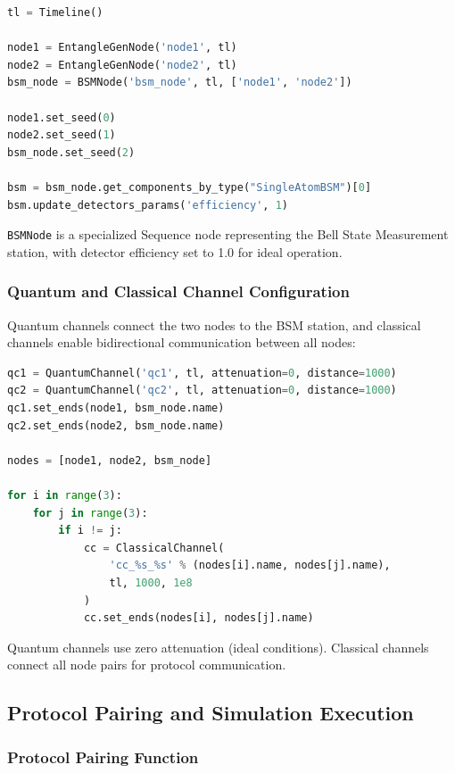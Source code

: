 \begin{lstlisting}[language=Python, breaklines=true]
tl = Timeline()

node1 = EntangleGenNode('node1', tl)
node2 = EntangleGenNode('node2', tl)
bsm_node = BSMNode('bsm_node', tl, ['node1', 'node2'])

node1.set_seed(0)
node2.set_seed(1)
bsm_node.set_seed(2)

bsm = bsm_node.get_components_by_type("SingleAtomBSM")[0]
bsm.update_detectors_params('efficiency', 1)
\end{lstlisting}

\texttt{BSMNode} is a specialized Sequence node representing the Bell State Measurement station, with detector efficiency set to 1.0 for ideal operation.

\subsubsection{Quantum and Classical Channel Configuration}

Quantum channels connect the two nodes to the BSM station, and classical channels enable bidirectional communication between all nodes:

\begin{lstlisting}[language=Python, breaklines=true]
qc1 = QuantumChannel('qc1', tl, attenuation=0, distance=1000)
qc2 = QuantumChannel('qc2', tl, attenuation=0, distance=1000)
qc1.set_ends(node1, bsm_node.name)
qc2.set_ends(node2, bsm_node.name)

nodes = [node1, node2, bsm_node]

for i in range(3):
    for j in range(3):
        if i != j:
            cc = ClassicalChannel(
                'cc_%s_%s' % (nodes[i].name, nodes[j].name), 
                tl, 1000, 1e8
            )
            cc.set_ends(nodes[i], nodes[j].name)
\end{lstlisting}

Quantum channels use zero attenuation (ideal conditions). Classical channels connect all node pairs for protocol communication.

\subsection{Protocol Pairing and Simulation Execution}

\subsubsection{Protocol Pairing Function}

